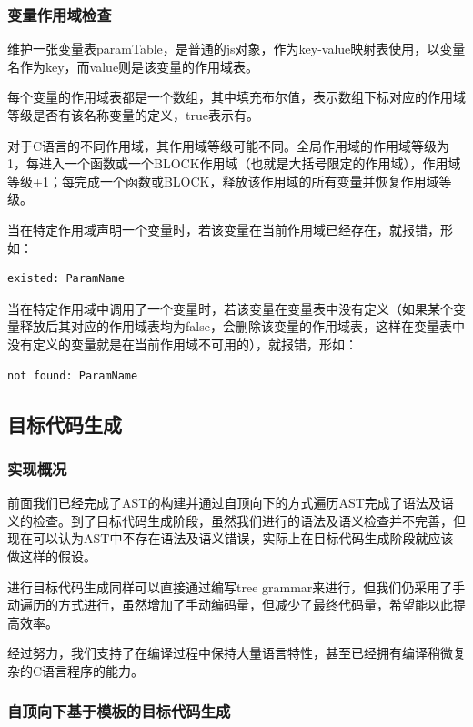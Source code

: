 \documentclass[a4paper]{article}
\begin{document}
\begin{CJK*}{UTF8}{gbsn}
    \subsubsection{变量作用域检查}
    维护一张变量表paramTable，是普通的js对象，作为key-value映射表使用，以变量名作为key，而value则是该变量的作用域表。
    \par 每个变量的作用域表都是一个数组，其中填充布尔值，表示数组下标对应的作用域等级是否有该名称变量的定义，true表示有。
    \par 对于C语言的不同作用域，其作用域等级可能不同。全局作用域的作用域等级为1，每进入一个函数或一个BLOCK作用域（也就是大括号限定的作用域），作用域等级+1；每完成一个函数或BLOCK，释放该作用域的所有变量并恢复作用域等级。
    \par 当在特定作用域声明一个变量时，若该变量在当前作用域已经存在，就报错，形如：
    \begin{verbatim}
existed: ParamName
    \end{verbatim}
    \par 当在特定作用域中调用了一个变量时，若该变量在变量表中没有定义（如果某个变量释放后其对应的作用域表均为false，会删除该变量的作用域表，这样在变量表中没有定义的变量就是在当前作用域不可用的），就报错，形如：
    \begin{verbatim}
not found: ParamName
    \end{verbatim}

    \subsection{目标代码生成}
    \subsubsection{实现概况}
    前面我们已经完成了AST的构建并通过自顶向下的方式遍历AST完成了语法及语义的检查。到了目标代码生成阶段，虽然我们进行的语法及语义检查并不完善，但现在可以认为AST中不存在语法及语义错误，实际上在目标代码生成阶段就应该做这样的假设。
    \par 进行目标代码生成同样可以直接通过编写tree grammar来进行，但我们仍采用了手动遍历的方式进行，虽然增加了手动编码量，但减少了最终代码量，希望能以此提高效率。
    \par 经过努力，我们支持了在编译过程中保持大量语言特性，甚至已经拥有编译稍微复杂的C语言程序的能力。

    \subsubsection{自顶向下基于模板的目标代码生成}
    

\end{CJK*}
\end{document}
